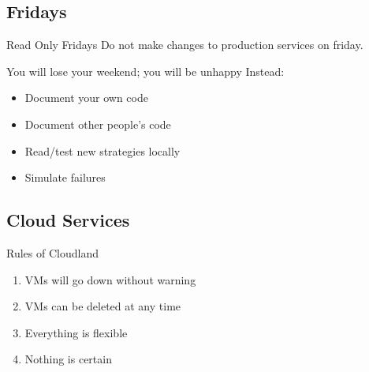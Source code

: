 \documentclass[12pt]{ufrslides}
\begin{document}
\subsection{Fridays}
\begin{frame}{Read Only Fridays}
	Do not make changes to production services on friday.

	You will lose your weekend; you will be unhappy
	\vfill
	Instead:
	\begin{itemize}
		\item Document your own code
		\item Document other people's code
		\item Read/test new strategies locally
		\item Simulate failures
	\end{itemize}
\end{frame}

\subsection{Cloud Services}
\begin{frame}{Rules of Cloudland}
	\begin{enumerate}
		\item VMs will go down without warning
		\item VMs can be deleted at any time
		\item Everything is flexible
		\item Nothing is certain%
	\end{enumerate}
\end{frame}
\end{document}
